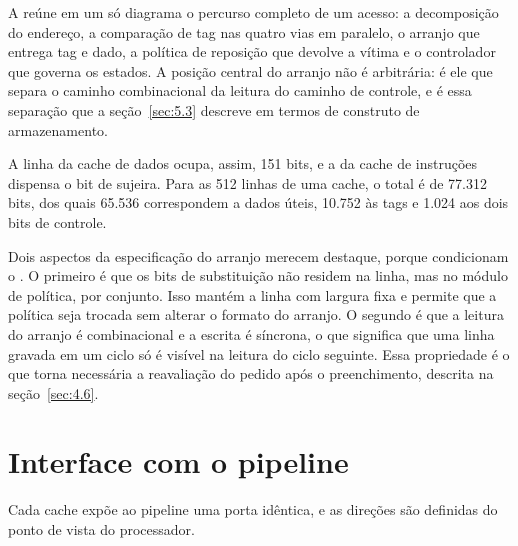 A  reúne em um só diagrama o percurso completo de um acesso: a decomposição do endereço, a comparação de tag nas quatro vias em paralelo, o arranjo que entrega tag e dado, a política de reposição que devolve a vítima e o controlador que governa os estados. A posição central do arranjo não é arbitrária: é ele que separa o caminho combinacional da leitura do caminho de controle, e é essa separação que a seção~\ref{sec:5.3} descreve em termos de construto de armazenamento.


A linha da cache de dados ocupa, assim, 151 bits, e a da cache de instruções dispensa o bit de sujeira. Para as 512 linhas de uma cache, o total é de 77.312 bits, dos quais 65.536 correspondem a dados úteis, 10.752 às tags e 1.024 aos dois bits de controle.

Dois aspectos da especificação do arranjo merecem destaque, porque condicionam o . O primeiro é que os bits de substituição não residem na linha, mas no módulo de política, por conjunto. Isso mantém a linha com largura fixa e permite que a política seja trocada sem alterar o formato do arranjo. O segundo é que a leitura do arranjo é combinacional e a escrita é síncrona, o que significa que uma linha gravada em um ciclo só é visível na leitura do ciclo seguinte. Essa propriedade é o que torna necessária a reavaliação do pedido após o preenchimento, descrita na seção~\ref{sec:4.6}.

\section{Interface com o pipeline}\label{sec:4.4}

Cada cache expõe ao pipeline uma porta idêntica, e as direções são definidas do ponto de vista do processador.

